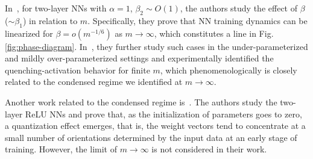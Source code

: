 \documentclass{article}
\begin{document}



In~\cite{e2020comparative}, for two-layer NNs with $\alpha=1$, $\beta_2\sim O(1)$, the authors study the effect of $\beta$ ($\sim \beta_1$) in relation to $m$. Specifically, they prove that NN training dynamics can be linearized for $\beta=o(m^{-1/6})$ as $m\to\infty$, which constitutes a line in Fig. \ref{fig:phase-diagram}. In~\cite{ma2020quenching}, they further study such cases in the under-parameterized and mildly over-parameterized settings and experimentally identified the quenching-activation behavior for finite $m$, which phenomenologically is closely related to the condensed regime we identified at $m\to\infty$.

Another work related to the condensed regime is~\cite{maennel2018gradient}. The authors study the two-layer ReLU NNs and prove that, as the initialization of parameters goes to zero, a quantization effect emerges, that is, the weight vectors tend to concentrate at a small number of orientations determined by the input data at an early stage of training. However, the limit of $m\to \infty$ is not considered in their work.


\end{document}
